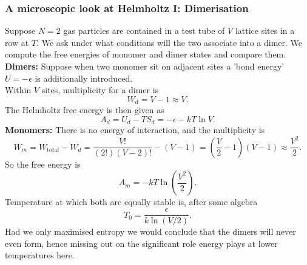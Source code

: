 \subsubsection{A microscopic look at Helmholtz I: Dimerisation}
Suppose $N=2$ gas particles are contained in a test tube of $V$ lattice sites in a row at $T$. We ask under what conditions will the two associate into a dimer. We compute the free energies of monomer and dimer states and compare them. \\
\textbf{Dimers: }Suppose when two monomer sit on adjacent sites a 'bond energy' $U=-\epsilon$ is additionally introduced. \\
Within $V$ sites, multiplicity for a dimer is 
\begin{equation}
W_{\text{d}}=V-1\approx V. 
\end{equation}
The Helmholtz free energy is then given as 
\begin{equation}
A_{d}=U_{d}-TS_{d}=-\epsilon-kT\ln V.
\end{equation}
\textbf{Monomers: }There is no energy of interaction, and the multiplicity is 
\begin{equation}
W_{m}=W_{\text{total}}-W_{d}=\frac{V!}{(2!)(V-2)!}-(V-1)=\left(\frac{V}{2}-1\right)(V-1)\approx\frac{V^2}{2}.
\end{equation}
So the free energy is
\begin{equation}
A_m=-kT\ln\left(\frac{V^2}{2}\right).
\end{equation}
Temperature at which both are equally stable is, after some algebra
\begin{equation}
T_0=\frac{\epsilon}{k\ln(V/2)}.
\end{equation}
Had we only maximised entropy we would conclude that the dimers will never even form, hence missing out on the significant role energy plays at lower temperatures here. 
